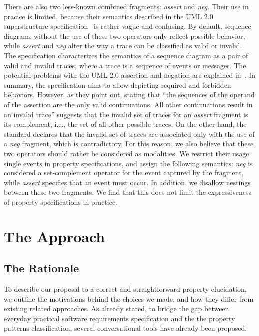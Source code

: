 \documentclass[letter]{llncs}
\begin{document}
There are also two less-known combined fragments: \emph{assert} and \emph{neg}. Their use in pracice
is limited, because their semantics described in the UML 2.0 superstructure specification~\cite{UML2.4_superstructure}
is rather vague and confusing. By default, sequence diagrams without the use of these two operators 
only reflect possible behavior, while \emph{assert} and \emph{neg} alter the way 
a trace can be classified as valid or invalid. The specification characterizes
the semantics of a sequence diagram as a pair of valid and invalid traces,
where a trace is a sequence of events or messages.
The potential problems with the UML 2.0 assertion and negation are explained in~\cite{Harel07assertand}.
In summary, the specification aims to allow depicting required and forbidden behaviors.
However, as they point out, stating that ``the sequences of the operand of the assertion are the only valid continuations. All other continuations result in an invalid trace''
suggests that the invalid set of traces for an \emph{assert} fragment is its complement, i.e., the set of all other possible traces.
On the other hand, the standard declares that the
invalid set of traces are associated only with the use of
a \emph{neg} fragment, which is contradictory.
For this reason, we also believe that these two operators should rather be considered 
as modalities. We restrict their usage single events in property specifications, and assign the following semantics:
\emph{neg} is considered a set-complement operator for the event captured by the fragment, while \emph{assert}
specifies that an event must occur. In addition, we
disallow nestings between these two fragments.
We find that this does not limit the expressiveness of property specifications in practice.
\section{The Approach}
\label{sec:Approach}

\subsection{The Rationale}
To describe our proposal to a correct and straightforward property elucidation,
we outline the motivations behind the choices we made, and how they differ from
existing related approaches. As already stated, to bridge the gap between everyday practical software 
requirements specification and the the property patterns classification,
several conversational tools have already been proposed. 
\end{document}
